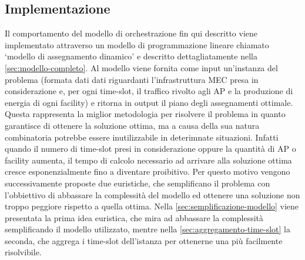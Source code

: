 %
%
\subsection{Implementazione}
\label{sub-sec:implementazione}

Il comportamento del modello di orchestrazione fin qui descritto viene implementato attraverso un modello di programmazione lineare chiamato `modello di assegnamento dinamico' e descritto dettagliatamente nella \autoref{sec:modello-completo}. Al modello viene fornita come input un'instanza del problema (formata dati dati riguardanti l'infrastruttura MEC presa in considerazione e, per ogni time-slot, il traffico rivolto agli AP e la produzione di energia di ogni facility) e ritorna in output il piano degli assegnamenti ottimale. Questa rappresenta la miglior metodologia per risolvere il problema in quanto garantisce di ottenere la soluzione ottima, ma a causa della sua natura combinatoria potrebbe essere inutilizzabile in deterimnate situazioni. Infatti quando il numero di time-slot presi in considerazione oppure la quantità di AP o facility aumenta, il tempo di calcolo necessario ad arrivare alla soluzione ottima cresce esponenzialmente fino a diventare proibitivo. Per questo motivo vengono successivamente proposte due euristiche, che semplificano il problema con l'obbiettivo di abbassare la complessità del modello ed ottenere una soluzione non troppo peggiore rispetto a quella ottima. Nella \autoref{sec:semplificazione-modello} viene presentata la prima idea euristica, che mira ad abbassare la complessità semplificando il modello utilizzato, mentre nella \autoref{sec:aggregamento-time-slot} la seconda, che aggrega i time-slot dell'istanza per ottenerne una più facilmente risolvibile.

